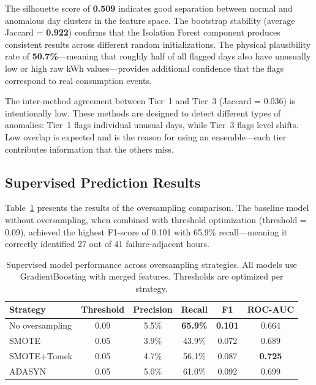 \documentclass{article}
\begin{document}
The silhouette score of \textbf{0.509} indicates good separation between normal and anomalous day clusters in the feature space. The bootstrap stability (average Jaccard = \textbf{0.922}) confirms that the Isolation Forest component produces consistent results across different random initializations. The physical plausibility rate of \textbf{50.7\%}---meaning that roughly half of all flagged days also have unusually low or high raw kWh values---provides additional confidence that the flags correspond to real consumption events.

The inter-method agreement between Tier~1 and Tier~3 (Jaccard = 0.036) is intentionally low. These methods are designed to detect different types of anomalies: Tier~1 flags individual unusual days, while Tier~3 flags level shifts. Low overlap is expected and is the reason for using an ensemble---each tier contributes information that the others miss.


\subsection{Supervised Prediction Results}

Table~\ref{tab:supervised} presents the results of the oversampling comparison. The baseline model without oversampling, when combined with threshold optimization (threshold = 0.09), achieved the highest F1-score of 0.101 with 65.9\% recall---meaning it correctly identified 27 out of 41 failure-adjacent hours.

\begin{table}[H]
\centering
\caption{Supervised model performance across oversampling strategies. All models use GradientBoosting with merged features. Thresholds are optimized per strategy.}
\label{tab:supervised}
\begin{tabular}{lccccc}
\toprule
\textbf{Strategy} & \textbf{Threshold} & \textbf{Precision} & \textbf{Recall} & \textbf{F1} & \textbf{ROC-AUC} \\
\midrule
No oversampling & 0.09 & 5.5\% & \textbf{65.9\%} & \textbf{0.101} & 0.664 \\
SMOTE & 0.05 & 3.9\% & 43.9\% & 0.072 & 0.689 \\
SMOTE+Tomek & 0.05 & 4.7\% & 56.1\% & 0.087 & \textbf{0.725} \\
ADASYN & 0.05 & 5.0\% & 61.0\% & 0.092 & 0.699 \\
\bottomrule
\end{tabular}
\end{table}
\end{document}
